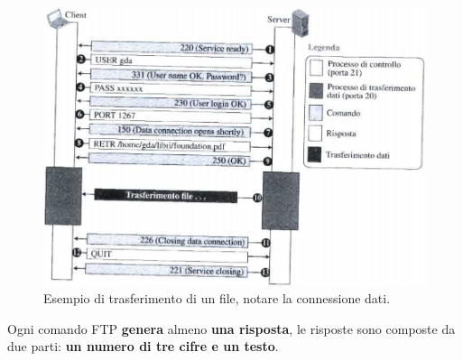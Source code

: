 \documentclass[11pt,a4paper,oneside]{book}
\theoremstyle{definition}
\begin{document}
\begin{figure}[!h]
	\includegraphics[scale=0.4]{Immagini/Ftp_transfer.png}
	\centering
	\caption{Esempio di trasferimento di un file, notare la connessione dati.}
\end{figure}
Ogni comando FTP \textbf{genera} almeno \textbf{una risposta}, le risposte sono composte da due parti: \textbf{un numero di tre cifre e un testo}.
\end{document}

